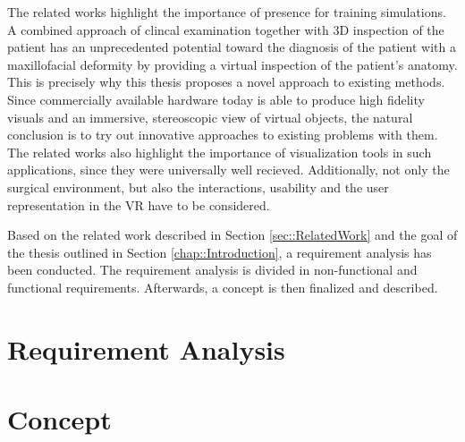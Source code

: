 The related works highlight the importance of presence for training simulations.
A combined approach of clincal examination together with 3D inspection of the patient has an unprecedented potential toward the diagnosis of the patient with a maxillofacial 
deformity \cite{swennen2009three} by providing a virtual inspection of the patient’s anatomy.
This is precisely why this thesis proposes a novel approach to existing methods.
Since commercially available hardware today is able to produce high fidelity visuals and an immersive, stereoscopic view of virtual objects,
the natural conclusion is to try out innovative approaches to existing problems with them.
The related works also highlight the importance of visualization tools in such applications, since they were universally well recieved. 
Additionally, not only the surgical environment, but also the interactions, usability and the user representation in the VR have to be considered.

Based on the related work described in Section \ref{sec::RelatedWork} and the goal of the thesis outlined in Section \ref{chap::Introduction}, a requirement analysis has been conducted.
The requirement analysis is divided in non-functional and functional requirements.
Afterwards, a concept is then finalized and described.

\section{\label{sec::RequirementAnalysis}Requirement Analysis}

\section{\label{sec::Concept}Concept}
